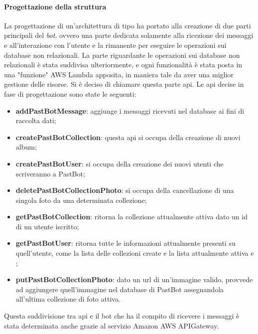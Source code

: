 \paragraph*{Progettazione della struttura } La
progettazione di un'architettura di tipo  ha
portato alla creazione di due parti principali del \textit{bot}, ovvero una
parte dedicata solamente alla ricezione dei messaggi e all'interazione con
l'utente e la rimanente per eseguire le operazioni sui database non relazionali.
La parte riguardante le operazioni sui database non relazionali è stata
suddivisa ulteriormente, e ogni funzionalità è stata posta in una "funzione"
AWS Lambda apposita, in maniera tale da aver una miglior gestione delle
risorse. Si è deciso di chiamare questa parte \gls{api}. Le \gls{api} decise in
fase di progettazione sono state le seguenti:
\begin{itemize}
  \item \textbf{addPastBotMessage}: aggiunge i messaggi ricevuti nel database
ai fini di raccolta dati;

  \item \textbf{createPastBotCollection}: questa \gls{api} si occupa della
creazione di nuovi album;

  \item \textbf{createPastBotUser}: si occupa della creazione dei nuovi utenti
che scriveranno a PastBot;

  \item \textbf{deletePastBotCollectionPhoto}: si occupa della cancellazione di
una singola foto da una determinata collezione;

  \item \textbf{getPastBotCollection}: ritorna la collezione attualmente attiva
dato un id di un utente iscritto;

  \item \textbf{getPastBotUser}: ritorna tutte le informazioni attualmente
presenti su quell'utente, come la lista delle collezioni create e la lista
attualmente attiva e ;

  \item \textbf{putPastBotCollectionPhoto}: dato un \gls{url} di un'immagine
valido, provvede ad aggiungere quell'immagine nel database di PastBot
assegnandola all'ultima collezione di foto attiva.
\end{itemize}

Questa suddivisione tra \gls{api} e il bot che ha il compito di ricevere i
messaggi è stata determinata anche grazie al servizio Amazon AWS APIGateway.

